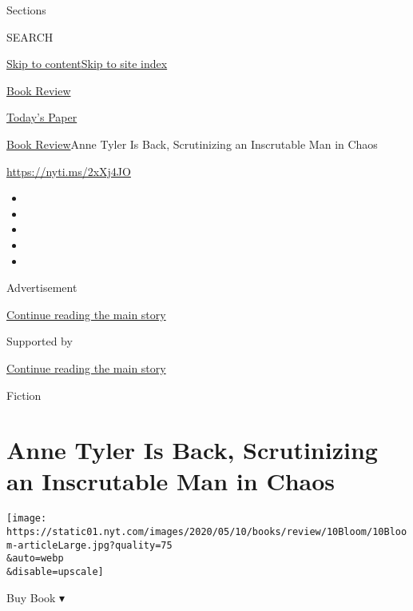 Sections

SEARCH

\protect\hyperlink{site-content}{Skip to
content}\protect\hyperlink{site-index}{Skip to site index}

\href{https://www.nytimes.com/section/books/review}{Book Review}

\href{https://myaccount.nytimes.com/auth/login?response_type=cookie\&client_id=vi}{}

\href{https://www.nytimes.com/section/todayspaper}{Today's Paper}

\href{/section/books/review}{Book Review}\textbar{}Anne Tyler Is Back,
Scrutinizing an Inscrutable Man in Chaos

\url{https://nyti.ms/2xXj4JO}

\begin{itemize}
\item
\item
\item
\item
\item
\end{itemize}

Advertisement

\protect\hyperlink{after-top}{Continue reading the main story}

Supported by

\protect\hyperlink{after-sponsor}{Continue reading the main story}

Fiction

\hypertarget{anne-tyler-is-back-scrutinizing-an-inscrutable-man-in-chaos}{%
\section{Anne Tyler Is Back, Scrutinizing an Inscrutable Man in
Chaos}\label{anne-tyler-is-back-scrutinizing-an-inscrutable-man-in-chaos}}

\texttt{[image: https://static01.nyt.com/images/2020/05/10/books/review/10Bloom/10Bloom-articleLarge.jpg?quality=75\\\&auto=webp\\\&disable=upscale]}

Buy Book ▾

